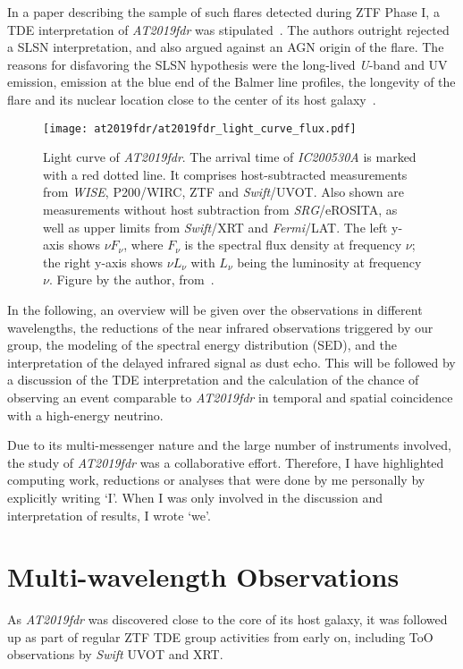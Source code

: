 In a paper describing the sample of such flares detected during ZTF Phase I, a TDE interpretation of \emph{AT2019fdr} was stipulated~\cite{Frederick2021}. The authors outright rejected a SLSN interpretation, and also argued against an AGN origin of the flare. The reasons for disfavoring the SLSN hypothesis were the long-lived \textit{U}-band and UV emission, emission at the blue end of the Balmer line profiles, the longevity of the flare and its nuclear location close to the center of its host galaxy~\cite{Frederick2021}.

\begin{figure*}[htb]
    \texttt{[image: at2019fdr/at2019fdr\_light\_curve\_flux.pdf]}
    \caption[\emph{AT2019fdr} light curve]{Light curve of \emph{AT2019fdr}. The arrival time of \emph{IC200530A} is marked with a red dotted line. It comprises host-subtracted measurements from \textit{WISE}, P200/WIRC, ZTF and \textit{Swift}/UVOT. Also shown are measurements without host subtraction from \textit{SRG}/eROSITA, as well as upper limits from \textit{Swift}/XRT and \textit{Fermi}/LAT. The left y-axis shows $\nu F_\nu$, where $F_\nu$ is the spectral flux density at frequency $\nu$; the right y-axis shows $\nu L_\nu$ with $L_\nu$ being the luminosity at frequency $\nu$. Figure by the author, from~\cite{Reusch2022}.}
\end{figure*}

In the following, an overview will be given over the observations in different wavelengths, the reductions of the near infrared observations triggered by our group, the modeling of the spectral energy distribution (SED), and the interpretation of the delayed infrared signal as dust echo. This will be followed by a discussion of the TDE interpretation and the calculation of the chance of observing an event comparable to \emph{AT2019fdr} in temporal and spatial coincidence with a high-energy neutrino.

Due to its multi-messenger nature and the large number of instruments involved, the study of \textit{AT2019fdr} was a collaborative effort. Therefore, I have highlighted computing work, reductions or analyses that were done by me personally by explicitly writing `I'. When I was only involved in the discussion and interpretation of results, I wrote `we'.

\section{Multi-wavelength Observations}
As \emph{AT2019fdr} was discovered close to the core of its host galaxy, it was followed up as part of regular ZTF TDE group activities from early on, including ToO observations by \textit{Swift} UVOT and XRT.

